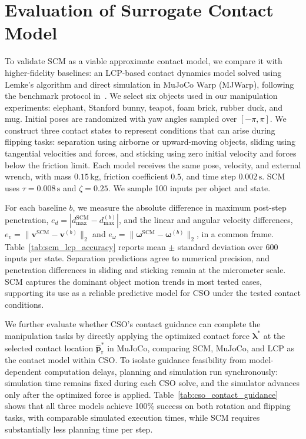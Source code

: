 \section{Evaluation of Surrogate Contact Model}
\label{sec:scm_evaluation}

To validate SCM as a viable approximate contact model, we compare it with higher-fidelity baselines: an LCP-based contact dynamics model solved using Lemke's algorithm and direct simulation in MuJoCo Warp (MJWarp), following the benchmark protocol in~\cite{borse2026comfree}. We select six objects used in our manipulation experiments: elephant, Stanford bunny, teapot, foam brick, rubber duck, and mug. Initial poses are randomized with yaw angles sampled over $[-\pi,\pi]$. We construct three contact states to represent conditions that can arise during flipping tasks: separation using airborne or upward-moving objects, sliding using tangential velocities and forces, and sticking using zero initial velocity and forces below the friction limit. Each model receives the same pose, velocity, and external wrench, with mass $0.15\,\mathrm{kg}$, friction coefficient $0.5$, and time step $0.002\,\mathrm{s}$. SCM uses $\tau=0.008\,\mathrm{s}$ and $\zeta=0.25$. We sample 100 inputs per object and state.

For each baseline $b$, we measure the absolute difference in maximum post-step penetration, $e_d=|d_{\max}^{\mathrm{SCM}}-d_{\max}^{(b)}|$, and the linear and angular velocity differences, $e_v=\|\boldsymbol{v}^{\mathrm{SCM}}-\boldsymbol{v}^{(b)}\|_2$ and $e_\omega=\|\boldsymbol{\omega}^{\mathrm{SCM}}-\boldsymbol{\omega}^{(b)}\|_2$, in a common frame. Table~\ref{tab:scm_lcp_accuracy} reports mean $\pm$ standard deviation over 600 inputs per state. Separation predictions agree to numerical precision, and penetration differences in sliding and sticking remain at the micrometer scale. SCM captures the dominant object motion trends in most tested cases, supporting its use as a reliable predictive model for CSO under the tested contact conditions.

We further evaluate whether CSO's contact guidance can complete the manipulation tasks by directly applying the optimized contact force $\boldsymbol{\lambda}^*$ at the selected contact location $\boldsymbol{\hat{p}}_{\mathrm{r}}^*$ in MuJoCo, comparing SCM, MuJoCo, and LCP as the contact model within CSO. To isolate guidance feasibility from model-dependent computation delays, planning and simulation run synchronously: simulation time remains fixed during each CSO solve, and the simulator advances only after the optimized force is applied. Table~\ref{tab:cso_contact_guidance} shows that all three models achieve 100\% success on both rotation and flipping tasks, with comparable simulated execution times, while SCM requires substantially less planning time per step.

